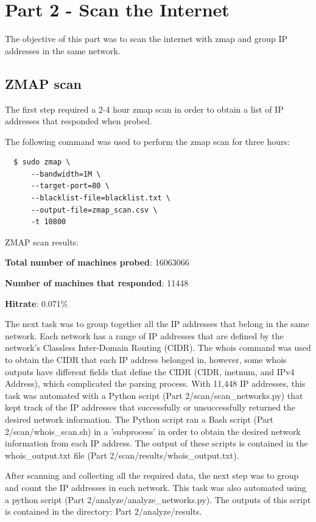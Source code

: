 \documentclass[11pt]{article}
\begin{document}
\section*{Part 2 - Scan the Internet}
\label{sec:part-2}
The objective of this part was to scan the internet with zmap and group IP addresses in the same network.
\subsection*{ZMAP scan}
The first step required a 2-4 hour zmap scan in order to obtain a list of IP addresses that responded when probed.
\newline

\noindent The following command was used to perform the zmap scan for three hours:
\begin{verbatim}
  $ sudo zmap \
      --bandwidth=1M \
      --target-port=80 \
      --blacklist-file=blacklist.txt \
      --output-file=zmap_scan.csv \
      -t 10800
\end{verbatim}
ZMAP scan results:

\textbf{Total number of machines probed}: 16063066

\textbf{Number of machines that responded}: 11448

\textbf{Hitrate}: 0.071\%
\newline

The next task was to group together all the IP addresses that belong in the same network.
Each network has a range of IP addresses that are defined by the network's Classless Inter-Domain Routing (CIDR).
The whois command was used to obtain the CIDR that each IP address belonged in, however,
some whois outputs have different fields that define the CIDR (CIDR, inetnum, and IPv4 Address), which complicated the parsing process.
With 11,448 IP addresses, this task was automated with a Python script (Part 2/scan/scan\_networks.py) that kept track of the IP addresses that successfully or unsuccessfully returned the desired network information.
The Python script ran a Bash script (Part 2/scan/whois\_scan.sh) in a 'subprocess' in order to obtain the desired network information from each IP address.
The output of these scripts is contained in the whois\_output.txt file (Part 2/scan/results/whois\_output.txt).

After scanning and collecting all the required data, the next step was to group and count the IP addresses in each network.
This task was also automated using a python script (Part 2/analyze/analyze\_networks.py).
The outputs of this script is contained in the directory: Part 2/analyze/results.
\newline
\end{document}
